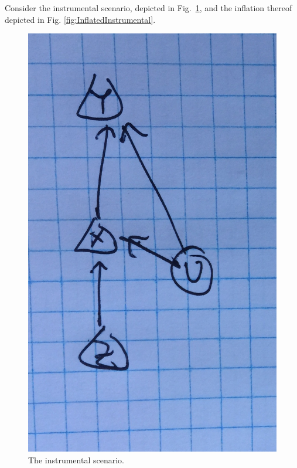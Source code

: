 \documentclass[aps,english,superscriptaddress,onecolumn,twoside,longbibliography,pra,floatfix,fleqn,nofootinbib]{revtex4-1}%
\theoremstyle{definition}
\begin{document}
Consider the instrumental scenario, depicted in Fig.~\ref{fig:instrumental}, and the inflation thereof depicted in Fig. \ref{fig:InflatedInstrumental}.
\begin{figure}[htb]
\centering
\begin{minipage}[h!]{0.4\linewidth}
\centering
\includegraphics[scale=0.1]{Instrumental.jpg}
\caption{The instrumental scenario.}\label{fig:instrumental}
\end{minipage}
\hfill
\begin{minipage}[htb]{0.5\linewidth}
\centering

\end{minipage}
\end{figure}
\end{document}
